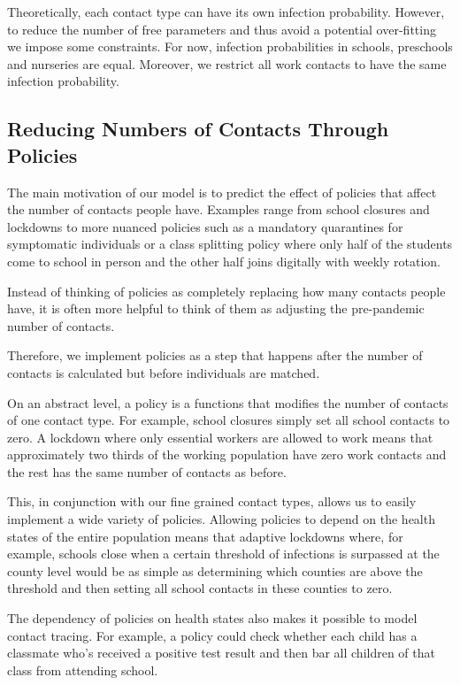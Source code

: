 Theoretically, each contact type can have its own infection probability. However, to reduce the number of free parameters and thus avoid a potential over-fitting we impose some constraints. For now, infection probabilities in schools, preschools and nurseries are equal. Moreover, we restrict all work contacts to have the same infection probability.


\subsection{Reducing Numbers of Contacts Through Policies}
\label{sec:policies}

The main motivation of our model is to predict the effect of policies that affect the number of contacts people have. Examples range from school closures and lockdowns to more nuanced policies such as a mandatory quarantines for symptomatic individuals or a class splitting policy where only half of the students come to school in person and the other half joins digitally with weekly rotation.

Instead of thinking of policies as completely replacing how many contacts people have, it is often more helpful to think of them as adjusting the pre-pandemic number of contacts.

Therefore, we implement policies as a step that happens after the number of contacts is calculated but before individuals are matched.

On an abstract level, a policy is a functions that modifies the number of contacts of one contact type. For example, school closures simply set all school contacts to zero. A lockdown where only essential workers are allowed to work means that approximately two thirds of the working population have zero work contacts and the rest has the same number of contacts as before.

This, in conjunction with our fine grained contact types, allows us to easily implement a wide variety of policies. Allowing policies to depend on the health states of the entire population means that adaptive lockdowns where, for example, schools close when a certain threshold of infections is surpassed at the county level would be as simple as determining which counties are above the threshold and then setting all school contacts in these counties to zero.

The dependency of policies on health states also makes it possible to model contact tracing. For example, a policy could check whether each child has a classmate who's received a positive test result and then bar all children of that class from attending school.

